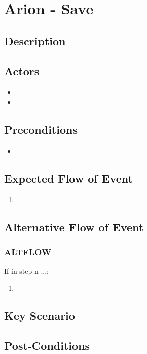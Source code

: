 \documentclass{scrreprt}
\begin{document}
\chapter*{Arion - Save}

\section*{Description}

\section*{Actors}
\begin{itemize}
    \item 
    \item 
\end{itemize}

\section*{Preconditions}
\begin{itemize}
    \item 
\end{itemize}

\section*{Expected Flow of Event}
\begin{enumerate}[1.]
    \item 
\end{enumerate}

\section*{Alternative Flow of Event}
\subsection*{ALTFLOW}
If in step n ...:
\begin{enumerate}
    \item 
\end{enumerate}

\section*{Key Scenario}

\section*{Post-Conditions}
\end{document}
